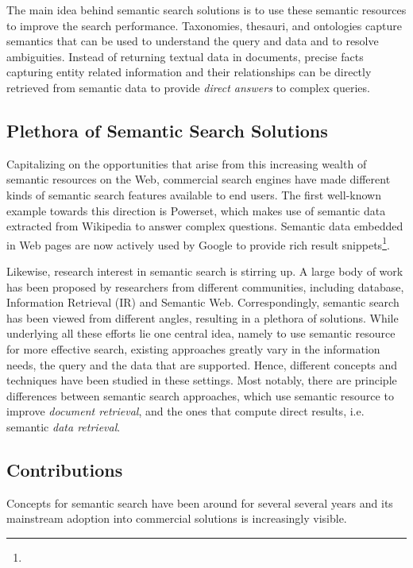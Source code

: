 The main idea behind semantic search solutions is to use these semantic resources to improve the search performance. Taxonomies, thesauri, and ontologies capture semantics that can be used to understand the query and data and to resolve ambiguities. Instead of returning textual data in documents, precise facts capturing entity related information and their relationships can be directly retrieved from semantic data to provide \emph{direct answers} to complex queries. 

\subsection{Plethora of Semantic Search Solutions}
Capitalizing on the opportunities that arise from this increasing wealth of semantic resources on the Web, commercial search engines have made different kinds of semantic search features available to end users. The first well-known example towards this direction is Powerset, which makes use of semantic data extracted from Wikipedia to answer complex questions. Semantic data embedded in Web pages are now actively used by Google to provide rich result snippets\footnote{}. 

Likewise, research interest in semantic search is stirring up. A large body of work has been proposed by researchers from different communities, including database, Information Retrieval (IR) and Semantic Web. Correspondingly, semantic search has been viewed from different angles, resulting in a plethora of solutions. While underlying all these efforts lie one central idea, namely to use semantic resource for more effective search, existing approaches greatly vary in the information needs, the query and the data that are supported. Hence, different concepts and techniques have been studied in these settings. Most notably, there are principle differences between semantic search approaches, which use semantic resource to improve \emph{document retrieval}, and the ones that compute direct results, i.e. semantic \emph{data retrieval}. 

\subsection{Contributions}
Concepts for semantic search have been around for several several years and its mainstream adoption into commercial solutions is increasingly visible. 

